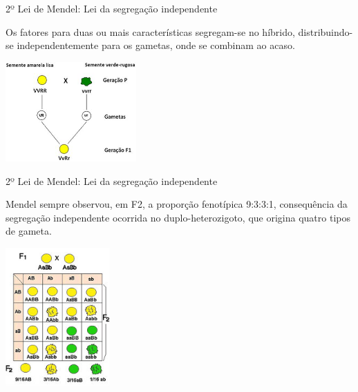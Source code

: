 \documentclass[]{beamer}
\begin{document}
  \begin{frame}{2º Lei de Mendel: Lei da segregação independente}
    \begin{center}
      Os fatores para duas ou mais características segregam-se no híbrido, distribuindo-se independentemente para os gametas, onde se combinam ao acaso.

      \hspace{0.5cm}

      \includegraphics[width=5cm]{images/image1.png}
    \end{center}
  \end{frame}

  \begin{frame}{2º Lei de Mendel: Lei da segregação independente}
    \begin{center}
        Mendel sempre observou, em F2, a proporção fenotípica 9:3:3:1, consequência da segregação independente ocorrida no duplo-heterozigoto, que origina quatro tipos de gameta.

        \hspace{0.5cm}

        \includegraphics[width=4cm]{images/proporcao1-edited}
    \end{center}
  \end{frame}
\end{document}
